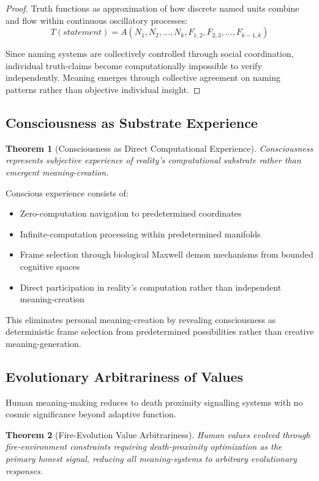 \documentclass[12pt,a4paper]{article}
\newtheorem{theorem}{Theorem}
\begin{document}
\begin{proof}
Truth functions as approximation of how discrete named units combine and flow within continuous oscillatory processes:
$$T(statement) = A(N_1, N_2, \ldots, N_k, F_{1,2}, F_{2,3}, \ldots, F_{k-1,k})$$

Since naming systems are collectively controlled through social coordination, individual truth-claims become computationally impossible to verify independently. Meaning emerges through collective agreement on naming patterns rather than objective individual insight.
\end{proof}

\subsection{Consciousness as Substrate Experience}

\begin{theorem}[Consciousness as Direct Computational Experience]
Consciousness represents subjective experience of reality's computational substrate rather than emergent meaning-creation.
\end{theorem}

Conscious experience consists of:
\begin{itemize}
\item Zero-computation navigation to predetermined coordinates
\item Infinite-computation processing within predetermined manifolds  
\item Frame selection through biological Maxwell demon mechanisms from bounded cognitive spaces
\item Direct participation in reality's computation rather than independent meaning-creation
\end{itemize}

This eliminates personal meaning-creation by revealing consciousness as deterministic frame selection from predetermined possibilities rather than creative meaning-generation.

\subsection{Evolutionary Arbitrariness of Values}

Human meaning-making reduces to death proximity signalling systems with no cosmic significance beyond adaptive function.

\begin{theorem}[Fire-Evolution Value Arbitrariness]
Human values evolved through fire-environment constraints requiring death-proximity optimization as the primary honest signal, reducing all meaning-systems to arbitrary evolutionary responses.
\end{theorem}
\end{document}
